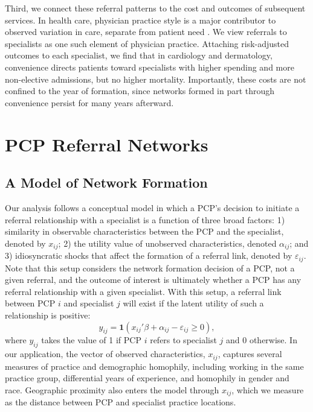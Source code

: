 \documentclass[12pt]{article}
\begin{document}
Third, we connect these referral patterns to the cost and outcomes of subsequent services. In health care, physician practice style is a major contributor to observed variation in care, separate from patient need \citep{finkelstein2016, molitor2018, badinski2023}. We view referrals to specialists as one such element of physician practice. Attaching risk-adjusted outcomes to each specialist, we find that in cardiology and dermatology, convenience directs patients toward specialists with higher spending and more non-elective admissions, but no higher mortality. Importantly, these costs are not confined to the year of formation, since networks formed in part through convenience persist for many years afterward.


\section{PCP Referral Networks}
\label{sec:model}

\subsection{A Model of Network Formation}
Our analysis follows a conceptual model in which a PCP's decision to initiate a referral relationship with a specialist is a function of three broad factors: 1) similarity in observable characteristics between the PCP and the specialist, denoted by $x_{ij}$; 2) the utility value of unobserved characteristics, denoted $\alpha_{ij}$; and 3) idiosyncratic shocks that affect the formation of a referral link, denoted by $\varepsilon_{ij}$. Note that this setup considers the network formation decision of a PCP, not a given referral, and the outcome of interest is ultimately whether a PCP has any referral relationship with a given specialist. With this setup, a referral link between PCP $i$ and specialist $j$ will exist if the latent utility of such a relationship is positive:
\begin{equation}\label{eq:referral}
    y_{ij} = \mathbf{1} \left(x_{ij}'\beta + \alpha_{ij} - \varepsilon_{ij} \geq 0\right),
\end{equation}
where $y_{ij}$ takes the value of 1 if PCP $i$ refers to specialist $j$ and 0 otherwise. In our application, the vector of observed characteristics, $x_{ij}$, captures several measures of practice and demographic homophily, including working in the same practice group, differential years of experience, and homophily in gender and race. Geographic proximity also enters the model through $x_{ij}$, which we measure as the distance between PCP and specialist practice locations.
\end{document}
